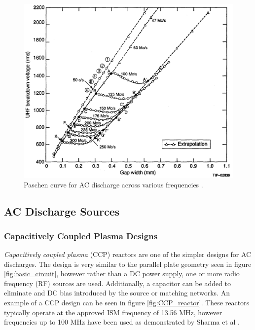 \begin{figure}[h!]
	\centering
	\includegraphics[width=\linewidth]{chapter_2/figures/ac_breakdown.png}
	\caption{Paschen curve for AC discharge across various frequencies \cite{Pim1949}.}
	\label{fig:ac_breakdown}
\end{figure} 

\pagebreak


\subsection{AC Discharge Sources}
\subsubsection{Capacitively Coupled Plasma Designs}

\textit{Capacitively coupled plasma} (CCP) reactors are one of the simpler designs for AC discharges. The design is very similar to the parallel plate geometry seen in figure \ref{fig:basic_circuit}, however rather than a DC power supply, one or more radio frequency (RF) sources are used. Additionally, a capacitor can be added to eliminate and DC bias introduced by the source or matching networks. An example of a CCP design can be seen in figure \ref{fig:CCP_reactor}. These reactors typically operate at the approved ISM frequency of 13.56 MHz, however frequencies up to 100 MHz have been used as demonstrated by Sharma et al \cite{Sharma2020}.


